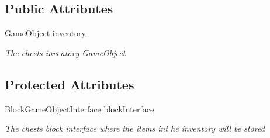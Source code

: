 \subsection*{Public Attributes}
\begin{DoxyCompactItemize}
\item 
Game\+Object \hyperlink{class_bee_game_1_1_inventory_1_1_chest_inventory_ac6fe8eed65557a7eb99e56d201c55466}{inventory}
\begin{DoxyCompactList}\small\item\em The chests inventory Game\+Object \end{DoxyCompactList}\end{DoxyCompactItemize}
\subsection*{Protected Attributes}
\begin{DoxyCompactItemize}
\item 
\hyperlink{class_bee_game_1_1_blocks_1_1_block_game_object_interface}{Block\+Game\+Object\+Interface} \hyperlink{class_bee_game_1_1_inventory_1_1_chest_inventory_aa18498b9af704585d4c747ff5a7444f8}{block\+Interface}
\begin{DoxyCompactList}\small\item\em The chests block interface where the items int he inventory will be stored \end{DoxyCompactList}\end{DoxyCompactItemize}
